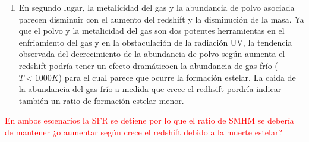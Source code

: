 \documentclass{article}
\begin{document}
\begin{enumerate}[I) ]
\item En segundo lugar, la metalicidad del gas y la abundancia de polvo asociada parecen disminuir con el aumento del redshift y la disminución de la masa. Ya que el polvo y la metalicidad del gas son dos potentes herramientas en el enfriamiento del gas y en la obstaculación de la radiación UV, la tendencia observada del decrecimiento de la abundancia de polvo según aumenta el redshift podría tener un efecto dramáticoen la abundancia de gas frío ($T<1000 K$) para el cual parece que ocurre la formación estelar. La caida de la abundancia del gas frío a medida que crece el redhsift pordría indicar también un ratio de formación estelar menor.
\end{enumerate}

\textcolor{red}{En ambos escenarios la SFR se detiene por lo que el ratio de SMHM se debería de mantener ¿o aumentar según crece el redshift debido a la muerte estelar?}






\newpage





\end{document}
